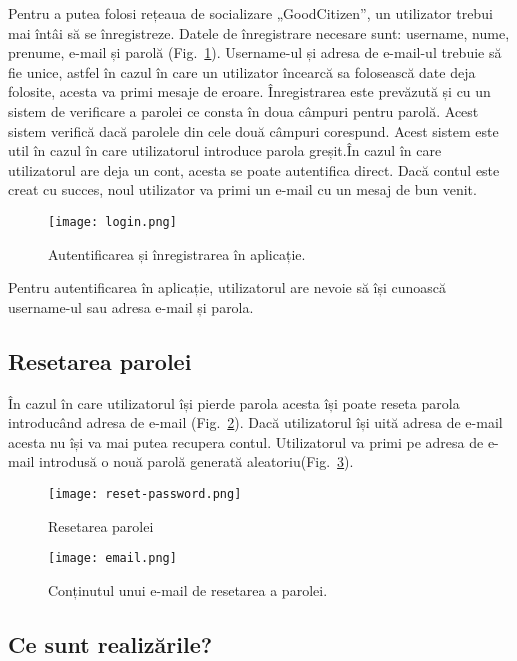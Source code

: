     Pentru a putea folosi rețeaua de socializare „GoodCitizen”, un utilizator trebui mai întâi să se înregistreze. Datele de  
    înregistrare necesare sunt: username, nume, prenume, e-mail și parolă (Fig.~\ref{fig:login}). Username-ul și adresa de e-mail-ul trebuie  
    să fie unice, astfel în cazul în care un utilizator încearcă sa folosească date deja folosite, acesta  
    va primi mesaje de eroare. Înregistrarea este prevăzută și cu un sistem de verificare a parolei  
    ce consta în doua câmpuri pentru parolă. Acest sistem verifică dacă parolele din cele două câmpuri corespund.  
    Acest sistem este util în cazul în care utilizatorul introduce parola greșit.În cazul în care utilizatorul 
    are deja un cont, acesta se poate autentifica direct. Dacă contul este creat cu succes, noul utilizator va primi un e-mail cu  
    un mesaj de bun venit. 
    \begin{figure}[h] 
    \texttt{[image: login.png]} 
    \centering 
    \caption{Autentificarea și înregistrarea în aplicație.} 
    \label{fig:login} 
    \end{figure}  
 
    Pentru autentificarea în aplicație, utilizatorul are nevoie să își cunoască username-ul sau adresa e-mail și parola. 
\subsection{Resetarea parolei} 

    În cazul în care utilizatorul își pierde parola acesta își poate reseta parola introducând adresa de e-mail (Fig.~\ref{fig:reset-password}).
    Dacă utilizatorul își uită adresa de e-mail acesta nu își va mai putea recupera contul.
    Utilizatorul va primi pe adresa de e-mail introdusă o nouă parolă generată aleatoriu(Fig.~\ref{fig:email}).
    \begin{figure}[h]
    \texttt{[image: reset-password.png]}
    \centering
    \caption{Resetarea parolei}
    \label{fig:reset-password}
    \end{figure} 
    \begin{figure}[h]
    \texttt{[image: email.png]}
    \centering
    \caption{Conținutul unui e-mail de resetarea a parolei.}
    \label{fig:email}
    \end{figure}
\subsection{Ce sunt realizările?}

